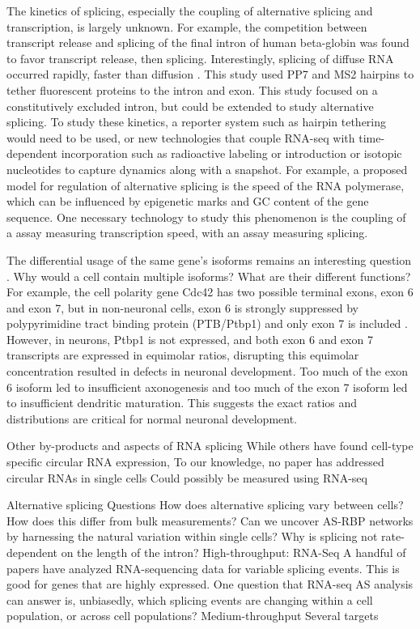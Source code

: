 The kinetics of splicing, especially the coupling of alternative splicing and transcription, is largely unknown. For example, the competition between transcript release and splicing of the final intron of human beta-globin was found to favor transcript release, then splicing. Interestingly, splicing of diffuse RNA occurred rapidly, faster than diffusion \cite{Coulon2014-he}. This study used PP7 and MS2 hairpins to tether fluorescent proteins to the intron and exon. This study focused on a constitutively excluded intron, but could be extended to study alternative splicing. To study these kinetics, a reporter system such as hairpin tethering would need to be used, or new technologies that couple RNA-seq with time-dependent incorporation such as radioactive labeling or introduction or isotopic nucleotides to capture dynamics along with a snapshot. For example, a proposed model for regulation of alternative splicing is the speed of the RNA polymerase, which can be influenced by epigenetic marks and GC content of the gene sequence. One necessary technology to study this phenomenon is the coupling of a assay measuring transcription speed, with an assay measuring splicing.

The differential usage of the same gene's isoforms remains an interesting question \cite{Yap:2016ig}. Why would a cell contain multiple isoforms? What are their different functions? For example, the cell polarity gene Cdc42 has two possible terminal exons, exon 6 and exon 7, but in non-neuronal cells, exon 6 is strongly suppressed by polypyrimidine tract binding protein (PTB/Ptbp1) and only exon 7 is included \cite{Yap:2016bs}. However, in neurons, Ptbp1 is not expressed, and both exon 6 and exon 7 transcripts are expressed in equimolar ratios, disrupting this equimolar concentration resulted in defects in neuronal development. Too much of the exon 6 isoform led to insufficient axonogenesis and too much of the exon 7 isoform led to insufficient dendritic maturation. This suggests the exact ratios and distributions are critical for normal neuronal development.

Other by-products and aspects of RNA splicing
While others have found cell-type specific circular RNA \cite{Salzman2013-ol} expression, To our knowledge, no paper has addressed circular RNAs in single cells
Could possibly be measured using RNA-seq

Alternative splicing
Questions
How does alternative splicing vary between cells?
How does this differ from bulk measurements?
Can we uncover AS-RBP networks by harnessing the natural variation within single cells?
Why is splicing not rate-dependent on the length of the intron?
High-throughput: RNA-Seq
A handful of papers have analyzed RNA-sequencing data for variable splicing events.
This is good for genes that are highly expressed.
One question that RNA-seq AS analysis can answer is, unbiasedly, which splicing events are changing within a cell population, or across cell populations?
Medium-throughput
Several targets

